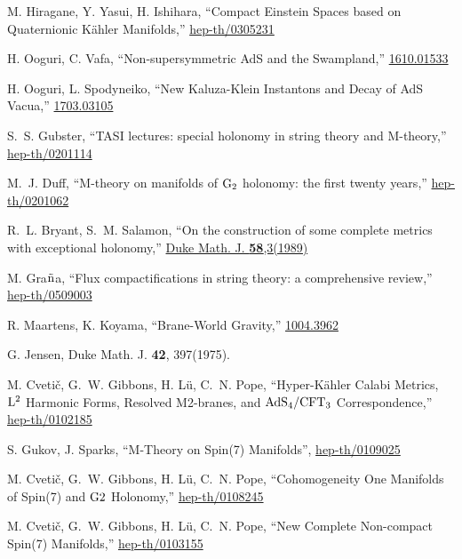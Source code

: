\documentclass[12pt, a4paper]{article}
\numberwithin{equation}{section}
\begin{document}
\begin{thebibliography}{10}
M. Hiragane, Y. Yasui, H. Ishihara, ``{Compact Einstein Spaces based on Quaternionic K\"ahler Manifolds},'' \href{https://arxiv.org/pdf/hep-th/0305231.pdf}{hep-th/0305231}

H. Ooguri, C. Vafa, ``{Non-supersymmetric AdS and the Swampland},'' \href{https://arxiv.org/pdf/1610.01533.pdf}{1610.01533}

H. Ooguri, L. Spodyneiko, ``{New Kaluza-Klein Instantons and Decay of AdS Vacua},'' \href{https://arxiv.org/pdf/1703.03105.pdf}{1703.03105}

S.~S. Gubster, ``{TASI lectures: special holonomy
	in string theory and M-theory},'' \href{https://arxiv.org/pdf/hep-th/0201114.pdf}{hep-th/0201114}

M.~J. Duff, ``{M-theory on manifolds of	${\rm G_2}$ holonomy: the first twenty years},'' \href{https://arxiv.org/pdf/hep-th/0201062.pdf}{hep-th/0201062}

R.~L. Bryant, S.~M. Salamon, ``{On the construction of some complete metrics with exceptional holonomy},'' \href{https://projecteuclid.org/download/pdf_1/euclid.dmj/1077307681}{Duke Math. J. \textbf{58},3(1989)}

M. Gra${\rm \tilde{n}}$a, ``{Flux compactifications in string theory: a comprehensive review},'' \href{https://arxiv.org/abs/hep-th/0509003}{hep-th/0509003}

R. Maartens, K. Koyama, ``{Brane-World Gravity},'' \href{https://arxiv.org/pdf/1004.3962.pdf}{1004.3962}

G. Jensen, Duke Math. J. \textbf{42}, 397(1975).

M. Cveti\v c, G.~W. Gibbons, H. L\"u, C.~N. Pope, ``{Hyper-K\"ahler Calabi Metrics, ${\rm L^2}$ Harmonic Forms,	Resolved M2-branes, and ${\rm AdS_4/CFT_3}$ Correspondence},'' \href{https://arxiv.org/pdf/hep-th/0102185.pdf}{hep-th/0102185}

S. Gukov, J. Sparks, ``{M-Theory on Spin(7) Manifolds}'', \href{https://arxiv.org/pdf/hep-th/0109025.pdf}{hep-th/0109025}

M. Cveti\v c, G.~W. Gibbons, H. L\"u, C.~N. Pope, ``{Cohomogeneity One Manifolds of Spin(7) and ${\rm G2}$ Holonomy},'' \href{https://arxiv.org/pdf/hep-th/0108245.pdf}{hep-th/0108245}

M. Cveti\v c, G.~W. Gibbons, H. L\"u, C.~N. Pope, ``{New Complete Non-compact Spin(7) Manifolds},'' \href{https://arxiv.org/pdf/hep-th/0103155.pdf}{hep-th/0103155}


\end{thebibliography}
\end{document}
